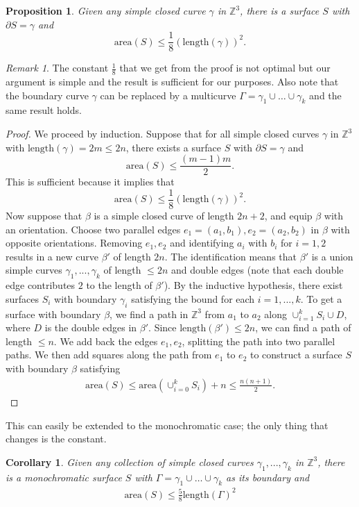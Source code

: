 \documentclass[11pt]{article}
\newtheorem{prop}[thm]{Proposition}
\newtheorem{cor}[thm]{Corollary}
\theoremstyle{remark}
\newtheorem{rem}[thm]{Remark}
\theoremstyle{definition}
\newcommand{\m}[1]{\mathbb{#1}}
\begin{document}
\begin{prop}\label{iso1}
Given any simple closed curve $\gamma$ in $\mathbb Z^3$, there is a surface $S$ with $\partial S = \gamma$ and 
$$\text{area}(S)\leq \frac{1}{8} (\text{length}(\gamma))^2.$$
\end{prop}
\begin{rem}The constant $\frac{1}{8}$ that we get from the proof is not optimal but our argument is simple and the result is sufficient for our purposes. Also note that the boundary curve $\gamma$ can be replaced by a multicurve $\Gamma = \gamma_1 \cup\dots \cup \gamma_k$ and the same result holds. 
\end{rem}
\begin{proof}
We proceed by induction. Suppose that for all simple closed curves $\gamma$ in $\m Z^3$ with $\text{length}(\gamma)=2m\leq 2n$, there exists a surface $S$ with $\partial S = \gamma$ and
$$\text{area}(S)\leq \frac{(m-1)m}{2}.$$
This is sufficient because it implies that
$$\text{area}(S)\leq \frac{1}{8}(\text{length}(\gamma))^2.$$
Now suppose that $\beta$ is a simple closed curve of length $2n+2$, and equip $\beta$ with an orientation. Choose two parallel edges $e_1=(a_1,b_1),e_2=(a_2,b_2)$ in $\beta$ with opposite orientations. Removing $e_1,e_2$ and identifying $a_i$ with $b_i$ for $i=1,2$ results in a new curve $\beta'$ of length $2n$. The identification means that $\beta'$ is a union simple curves $\gamma_1,...,\gamma_k$ of length $\leq 2n$ and double edges (note that each double edge contributes $2$ to the length of $\beta'$). By the inductive hypothesis, there exist surfaces $S_i$ with boundary $\gamma_i$ satisfying the bound for each $i=1,...,k$. To get a surface with boundary $\beta$, we find a path in $\m Z^3$ from $a_1$ to $a_2$ along $\cup_{i=1}^k S_i\cup D$, where $D$ is the double edges in $\beta'$. Since $\text{length}(\beta')\leq 2n$, we can find a path of length $\leq n$. We add back the edges $e_1, e_2$, splitting the path into two parallel paths. We then add squares along the path from $e_1$ to $e_2$ to construct a surface $S$ with boundary $\beta$ satisfying 
\begin{align*}
    \text{area}(S) \leq \text{area}(\cup_{i=0}^k S_i) + n \leq \frac{n(n+1)}{2}.
\end{align*}
\end{proof}

This can easily be extended to the monochromatic case; the only thing that changes is the constant.

\begin{cor}\label{iso2}
    Given any collection of simple closed curves $\gamma_1,...,\gamma_k$ in $\mathbb{Z}^3$, there is a monochromatic surface $S$ with $\Gamma=\gamma_1\cup \dots\cup\gamma_k$ as its boundary and 
    \begin{align*}
        \text{area}(S) \leq \frac{5}{8} \text{length}(\Gamma)^2
    \end{align*}
\end{cor}
\end{document}
